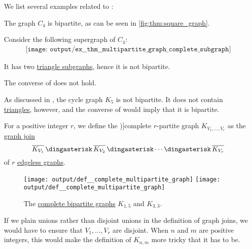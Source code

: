 \begin{example}\label{ex:thm:multipartite_graph_complete_subgraph}
  We list several examples related to :
  \begin{thmenum}
     The graph \( C_4 \) is bipartite, as can be seen in \cref{fig:thm:square_graph}.

    Consider the following supergraph of \( C_4 \):
    \begin{equation}\label{eq:ex:thm:multipartite_graph_complete_subgraph/triangle}
      \begin{aligned}
        \texttt{[image: output/ex\_\_thm\_\_multipartite\_graph\_complete\_subgraph]}
      \end{aligned}
    \end{equation}

    It has two \hyperref[def:triangle_graph]{triangle subgraphs}, hence it is not bipartite.

     The converse of  does not hold.

    As discussed in , the cycle graph \( K_5 \) is not bipartite. It does not contain \hyperref[def:triangle_graph]{triangles}, however, and the converse of  would imply that it is bipartite.
  \end{thmenum}
\end{example}

\begin{definition}\label{def:complete_multipartite_graph}
  For a positive integer \( r \), we define the \term[ru=полный \( r \)-дольный (граф) (\cite[\S 1]{Емеличев1990})]{complete \( r \)-partite} graph \( K_{V_1,\ldots,V_r} \) as the \hyperref[def:graph_join]{graph join}
  \begin{equation*}
    \oline{K_{V_1}} \Ast \oline{K_{V_2}} \Ast \cdots \Ast \oline{K_{V_r}}
  \end{equation*}
  of \( r \) \hyperref[def:edgeless_graph]{edgeless graphs}.

  \begin{figure}[!ht]
    \hfill
    \texttt{[image: output/def\_\_complete\_multipartite\_graph]}
    \hfill
    \texttt{[image: output/def\_\_complete\_multipartite\_graph]}
    \hfill
    \hfill
    \caption{The \hyperref[def:complete_multipartite_graph]{complete bipartite graphs} \( K_{1,5} \) and \( K_{3,3} \).}\label{fig:def:complete_multipartite_graph}
  \end{figure}
\end{definition}
\begin{comments}
  \item If we plain unions rather than disjoint unions in the definition of graph joins, we would have to ensure that \( V_1, \ldots, V_r \) are disjoint. When \( n \) and \( m \) are positive integers, this would make the definition of \( K_{n,m} \) more tricky that it has to be.
\end{comments}

